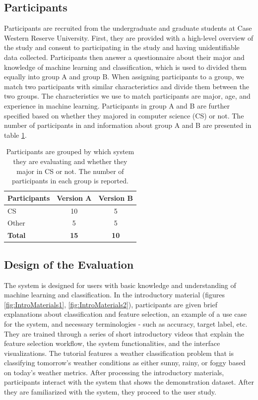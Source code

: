 \subsection{ Participants }
Participants are recruited from the undergraduate and graduate students at Case Western Reserve University. First, they are provided with a high-level overview of the study and consent to participating in the study and having unidentifiable data collected. Participants then answer a questionnaire about their major and knowledge of machine learning and classification, which is used to divided them equally into group A and group B. When assigning participants to a group, we match two participants with similar characteristics and divide them between the two groups. The characteristics we use to match participants are major, age, and experience in machine learning. Participants in group A and B are further specified based on whether they majored in computer science (CS) or not. The number of participants in and information about group A and B are presented in table \ref{ParticipantInfo}.

\begin{table}[]
\centering
\begin{tabular}{lcc}
\hline
Participants &  \multicolumn{1}{l}{Version A} &  \multicolumn{1}{l}{Version B} \\ \hline
CS           & 10        & 5        \\
Other       & 5         & 5         \\ \hline
\textbf{Total}        & \textbf{15}        & \textbf{10}        \\ \hline
\end{tabular}
\caption{Participants are grouped by which system they are evaluating and whether they major in CS or not. The number of participants in each group is reported. }
\label{ParticipantInfo}
\end{table}

\subsection {Design of the Evaluation}
The system is designed for users with basic knowledge and understanding of machine learning and classification. In the introductory material (figures \ref{fig:IntroMaterials1}, \ref{fig:IntroMaterials2}), participants are given brief explanations about classification and feature selection, an example of a use case for the system, and necessary terminologies - such as accuracy, target label, etc. They are trained through a series of short introductory videos that explain the feature selection workflow, the system functionalities, and the interface visualizations. The tutorial features a weather classification problem that is classifying tomorrow's weather conditions as either sunny, rainy, or foggy based on today's weather metrics. After processing the introductory materials, participants interact with the system that shows the demonstration dataset. After they are familiarized with the system, they proceed to the user study.

